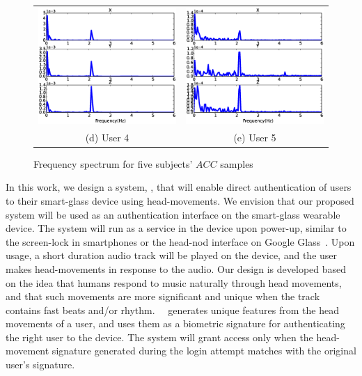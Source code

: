 \begin{figure}[t]
\begin{center}
\begin{tabular}{cc}
\includegraphics [width=.35\linewidth]{fig/freq_sub10}&
\includegraphics [width=.35\linewidth]{fig/freq_sub13}\\
(d) User 4& (e) User 5 \\
\end{tabular}
\end{center}
\caption{\label{fig:raw_freq} Frequency spectrum for five subjects' $ACC$ samples}
\end{figure}

In this work, we design a system, \systemname, that will enable direct
authentication of users to their smart-glass device using
head-movements.
We envision that our proposed system will be used as an authentication
interface on the smart-glass wearable device.
The system will run as a service in the device upon power-up,
similar to the screen-lock in smartphones or the head-nod interface on Google
Glass~\cite{googleglass}. Upon usage, a short duration audio track
will be played on the device, and the user makes head-movements in
response to the audio. Our design is developed based on
the idea that humans respond to music naturally through head movements, and that such movements are more
significant and unique when the track contains fast beats and/or rhythm.
~\systemname~generates unique features from the head
movements of a user, and uses them as a biometric signature for
authenticating the right user to the device. The system will
grant access only when the head-movement signature
generated during the login attempt matches with the
original user's signature.

